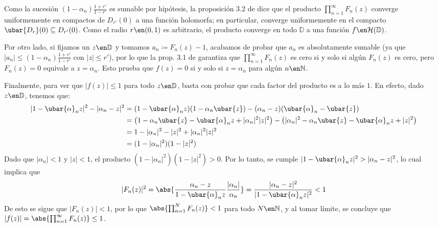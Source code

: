 \begin{sol}
\begin{enumerate}[label=(\alph*), leftmargin = 1.5em]
Como la sucesión $(1-\alpha_n)\frac{1+r'}{1-r'}$ es sumable por hipótesis, la proposición 3.2 de \cite[\S 5.3]{stein} dice que el producto $\prod^\infty_{n=1}F_n(z)$ converge uniformemente en compactos de $D_{r'}(0)$ a una función holomorfa; en particular, converge uniformemente en el compacto $\ubar{D_r}(0) \subseteq D_{r'}(0)$. Como el radio $r\en(0,1)$ es arbitrario, el producto converge en todo $\mathbb{D}$ a una función $f\en\mathcal{H}(\mathbb{D})$.\par
Por otro lado, si fijamos un $z\en\mathbb{D}$ y tomamos $a_n \coloneq F_n(z)-1$, acabamos de probar que $a_n$ es absolutamente sumable (ya que $|a_n| \le (1-\alpha_n)\frac{1+r'}{1-r'}$ con $|z| \le r'$), por lo que la prop. 3.1 de \cite[\S 5.3]{stein} garantiza que $\prod^\infty_{n=1}F_n(z)$ es cero si y solo si algún $F_n(z)$ es cero, pero $F_n(z) = 0$ equivale a $z = \alpha_n$. Esto prueba que $f(z) = 0$ si y solo si $z=\alpha_n$ para algún $n\en\mathbb{N}$.\par
Finalmente, para ver que $|f(z)| \le 1$ para todo $z \en \mathbb{D}$, basta con probar que cada factor del producto es a lo más $1$. En efecto, dado $z\en\mathbb{D}$, tenemos que:
\begin{align*}
|1 - \ubar{\alpha}_n z|^2 - |\alpha_n - z|^2 
&= (1 - \ubar{\alpha}_n z)(1 - \alpha_n \ubar{z}) - (\alpha_n - z)(\ubar{\alpha}_n - \ubar{z}) \\
&= \big(1 - \alpha_n \ubar{z} - \ubar{\alpha}_n z + |\alpha_n|^2|z|^2\big) 
 - \big(|\alpha_n|^2 - \alpha_n \ubar{z} - \ubar{\alpha}_n z + |z|^2\big) \\
&= 1 - |\alpha_n|^2 - |z|^2 + |\alpha_n|^2|z|^2 \\
&= (1 - |\alpha_n|^2)(1 - |z|^2)
\end{align*}
Dado que $|\alpha_n| < 1$ y $|z| < 1$, el producto $(1 - |\alpha_n|^2)(1 - |z|^2) > 0$.
Por lo tanto, se cumple $|1 - \ubar{\alpha}_n z|^2 > |\alpha_n - z|^2$, lo cual implica que
\[
|F_n(z)|^2 
= \abs{
    \frac{\alpha_n - z}{1 - \ubar{\alpha}_n z} \frac{|\alpha_n|}{\alpha_n}
}
= \frac{|\alpha_n - z|^2}{|1 - \ubar{\alpha}_n z|^2} < 1
\]
De esto se sigue que $|F_n(z)| < 1$, por lo que $\abs{\prod^N_{n=1}F_n(z)} < 1$ para todo $N\en\mathbb{N}$, y al tomar límite, se concluye que $|f(z)| = \abs{\prod^\infty_{n=1}F_n(z)} \le 1$.
\end{enumerate}
\end{sol}
